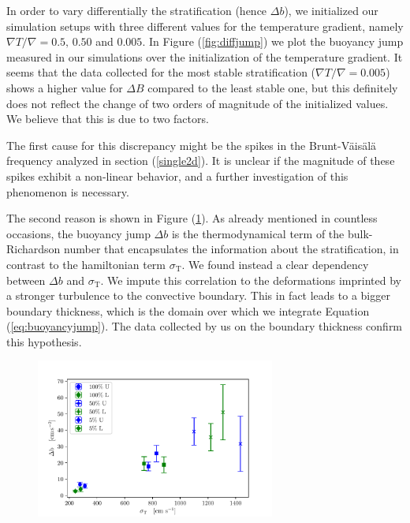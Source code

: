 In order to vary differentially the stratification (hence $\Delta b$), we initialized our simulation setups with three different values for the temperature gradient, namely $\nabla T / \nabla = 0.5, \, 0.50$ and  $0.005$. In Figure (\ref{fig:diffjump}) we plot the buoyancy jump measured in our simulations over the initialization of the temperature gradient. It seems that the data collected for the most stable stratification ($\nabla T / \nabla = 0.005$) shows a higher value for $\Delta B$ compared to the least stable one, but this definitely does not reflect the change of two orders of magnitude of the initialized values. We believe that this is due to two factors. 

The first cause for this discrepancy might be the spikes in the Brunt-Väisälä frequency analyzed in section (\ref{single2d}). It is unclear if the magnitude of these spikes exhibit a non-linear behavior, and a further investigation of this phenomenon is necessary. 

The second reason is shown in Figure (\ref{fig:diffcorr}). As already mentioned in countless occasions, the buoyancy jump $\Delta b$ is the thermodynamical term of the bulk-Richardson number that encapsulates the information about the stratification, in contrast to the hamiltonian term $\sigma_{\mathrm{T}}$. We found instead a clear dependency between $\Delta b$ and $\sigma_{\mathrm{T}}$. We impute this correlation to the deformations imprinted by a stronger turbulence to the convective boundary. This in fact leads to a bigger boundary thickness, which is the domain over which we integrate Equation (\ref{eq:buoyancyjump}). The data collected by us on the boundary thickness confirm this hypothesis.


\begin{figure}[t!]
\centering
\includegraphics[width=0.7\textwidth]{./img/differentialcorr.pdf}
\caption{}
\label{fig:diffcorr}
\centering
\end{figure}


